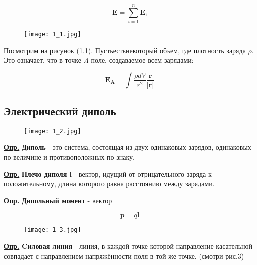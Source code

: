 \begin{equation}\label{opr3}
\mathbf{E} = \sum\limits_{i=1}^n \mathbf{E_{i}}
\end{equation}

\begin{figure}
\centering
 \texttt{[image: 1\_1.jpg]}     
 \label{fig:my_label}
 \caption{}
\end{figure}

Посмотрим на рисунок (1.1). Пустьестьнекоторый объем, где плотность заряда $\rho$. Это означает, что в точке \textit{A} поле, создаваемое всем зарядами:

\begin{equation}\label{opr4}
\mathbf{E_{A}} = \int \frac{\rho dV}{r^2} \frac{\mathbf{r}}{|\mathbf{r}|}
\end{equation}

\subsection{Электрический диполь}

\begin{figure}[!ht]
\centering
 \texttt{[image: 1\_2.jpg]}     
 \label{fig:my_label}
 \caption{}
\end{figure}

\colorbox{faded}{\underline{\textbf{Опр.}}} \textbf{Диполь} - это система, состоящая из  двух одинаковых зарядов, одинаковых по величине и противоположных по знаку.

\colorbox{faded}{\underline{\textbf{Опр.}}} \textbf{Плечо диполя $\mathbf{l}$} - вектор, идущий от отрицательного заряда к положительному, длина которого равна расстоянию между зарядами.

\colorbox{faded}{\underline{\textbf{Опр.}}} \textbf{Дипольный момент} - вектор 

\begin{equation}\label{opr5}
\mathbf{p} =q \mathbf{l}
\end{equation}

\begin{figure}[!ht]
\centering
 \texttt{[image: 1\_3.jpg]}     
 \label{fig:my_label}
 \caption{}
\end{figure}

\colorbox{faded}{\underline{\textbf{Опр.}}} \textbf{Cиловая линия} - линия, в каждой точке которой направление касательной совпадает с направлением напряжённости поля в той же точке. (смотри рис.3)

